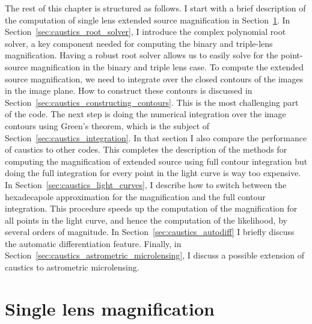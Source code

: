 \documentclass[12pt,dvipsnames]{report}
\newcommand{\ssf}[1]{\textsf{#1}}
\begin{document}
The rest of this chapter is structured as follows. I start with a brief description of 
the computation of single lens extended source magnification in 
Section~\ref{sec:caustics_single_lens}.
In Section~\ref{sec:caustics_root_solver}, I introduce the complex polynomial root solver, a
key component needed for computing the binary and triple-lens magnification.  
Having a robust root solver allows us to 
easily solve for the point-source magnification in the binary and triple lens case. 
To compute the extended source
magnification, we need to integrate over the closed contours of the images in the image plane.
How to construct these contours is discussed in Section~\ref{sec:caustics_constructing_contours}.
This is the most challenging part of the code.
The next step is doing the numerical integration over the image contours using Green's theorem,
which is the subject of Section~\ref{sec:caustics_integration}. In that section I also 
compare the performance of \ssf{caustics} to other codes.
This completes the description
of the methods for computing the magnification of extended source using full contour 
integration but doing the full integration for every point in the light curve is way too 
expensive. In Section~\ref{sec:caustics_light_curves}, I describe how to switch between
the hexadecapole approximation for the magnification and the full contour integration. 
This procedure speeds up the computation of the magnification for 
all points in the light curve, and hence the computation of the likelihood, by several orders of magnitude. 
In Section~\ref{sec:caustics_autodiff} I briefly discuss the automatic differentiation 
feature. Finally, in Section~\ref{sec:caustics_astrometric_microlensing}, I discuss a possible 
extension of \ssf{caustics} to astrometric microlensing.

\section{Single lens magnification}
\label{sec:caustics_single_lens}
\end{document}
